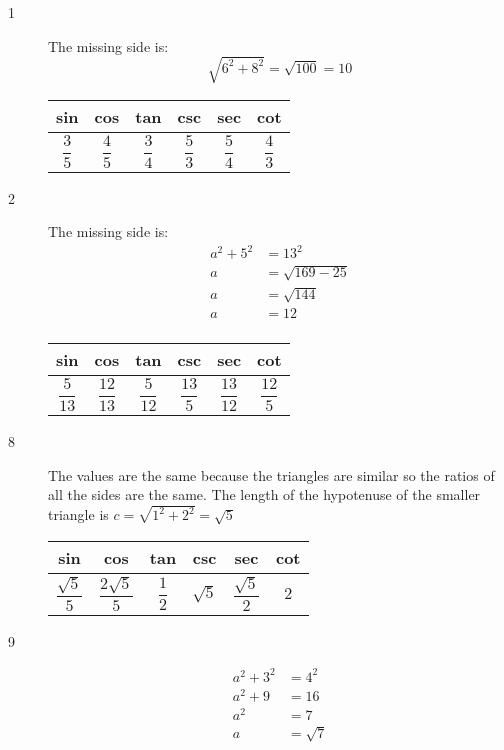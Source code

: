 \documentclass[fleqn,addpoints]{exam}
\begin{document}
\begin{description}

\item[1]
The missing side is: 
\[
  \sqrt{6^2 + 8^2} = \sqrt{100} = 10
\]

\begin{tabular}{cccccc}
\toprule
sin & cos & tan & csc & sec & cot \\
\midrule
  $\dfrac{3}{5}$ &  $\dfrac{4}{5}$ & $\dfrac{3}{4}$ & $\dfrac{5}{3}$ & $\dfrac{5}{4}$ & $\dfrac{4}{3}$ \\
\bottomrule
\end{tabular}

\item[2]
The missing side is:
\begin{align*}
  a^2 + 5^2 &= 13^2 \\
  a &= \sqrt{169-25} \\
  a &= \sqrt{144} \\
  a &= 12 \\
\end{align*}

\begin{tabular}{cccccc}
\toprule
sin & cos & tan & csc & sec & cot \\
\midrule
  $\dfrac{5}{13}$ &  $\dfrac{12}{13}$ & $\dfrac{5}{12}$ & $\dfrac{13}{5}$ & $\dfrac{13}{12}$ & $\dfrac{12}{5}$ \\
\bottomrule
\end{tabular}

\item[8]
The values are the same because the triangles are similar so the ratios of all the sides are the same.  The length of
the hypotenuse of the smaller triangle is $c = \sqrt{1^2 + 2^2} = \sqrt{5}$

\begin{tabular}{cccccc}
\toprule
sin & cos & tan & csc & sec & cot \\
\midrule
  $\dfrac{\sqrt{5}}{5}$ &  $\dfrac{2 \sqrt{5}}{5}$ & $\dfrac{1}{2}$ & $\sqrt{5}$ & $\dfrac{\sqrt{5}}{2}$ & $2$ \\
\bottomrule
\end{tabular}

\item[9]
\begin{align*}
  a^2 + 3^2 &= 4^2 \\
  a^2 + 9 &= 16 \\
  a^2 &= 7 \\
  a &= \sqrt{7} \\
\end{align*}


\end{description}
\end{document}
